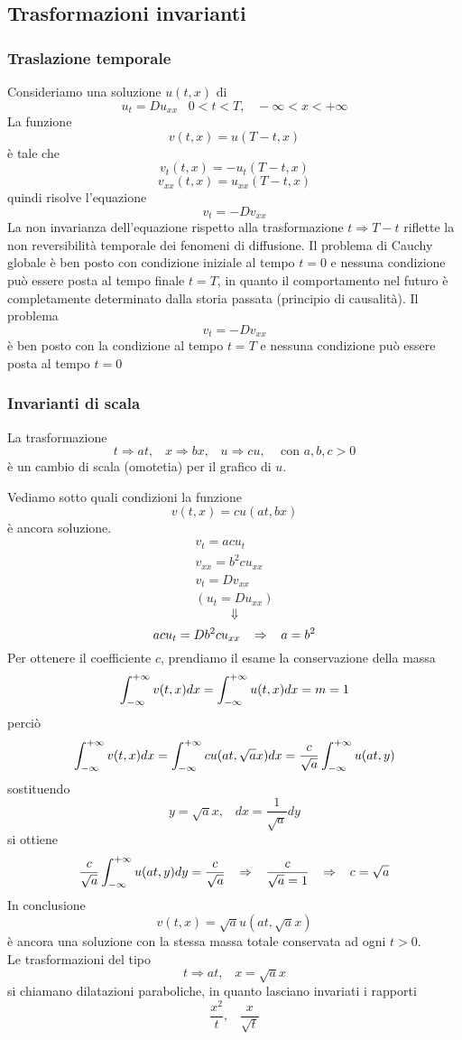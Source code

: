 \subsection{Trasformazioni invarianti}
\subsubsection{Traslazione temporale}
Consideriamo una soluzione $u(t,x)$ di
\[
	u_t= Du_{xx} \;\;\; 0< t< T, \;\;\; - \infty <x < +\infty
\]
La funzione
\[
	v(t,x)= u(T-t,x)
\]
\`e tale che
\[
	v_t(t,x)= -u_t(T-t, x)
\]
\[
	v_{xx}(t, x)= u_{xx}(T-t,x)
\]
quindi risolve l'equazione
\[
	v_t= -Dv_{xx}
\]
La non invarianza dell'equazione rispetto alla trasformazione $t \Rightarrow
T-t$
riflette la non reversibilit\`a temporale dei fenomeni di diffusione.
Il problema di Cauchy globale \`e ben posto con condizione iniziale al tempo
$t=0$ e nessuna condizione pu\`o essere posta al tempo finale $t=T$, in quanto
il comportamento nel futuro \`e completamente determinato dalla storia passata
(principio di causalit\`a).
Il problema
\[
	v_t= -Dv_{xx}
\]
\`e ben posto con la condizione al tempo $t=T$ e nessuna condizione pu\`o essere
posta al tempo $t=0$
\subsubsection{Invarianti di scala}
La trasformazione
\[
	t\Rightarrow at, \;\;\; x \Rightarrow bx, \;\;\; u\Rightarrow cu,
	\;\;\;
	\text{ con }
	a,b,c>0
\]
\`e un cambio di scala (omotetia) per il grafico di $u$.

Vediamo sotto quali condizioni la funzione
\[
	v(t,x)= cu(at, bx)
\]
\`e ancora soluzione.
\[
	\begin{array}{l}
		v_t= acu_t \\
		v_{xx}= b^2 c u_{xx}  \\
		v_t= Dv_{xx} \\
		\left( u_t= Du_{xx} \right)
	\end{array}
\]
\[
	\Downarrow
\]
\[
	acu_t= Db^2 c u_{xx} \;\;\; \Rightarrow \;\;\; a=b^2
\]
Per ottenere il coefficiente $c$, prendiamo il esame la conservazione della
massa
\[
	\int_{- \infty}^{+ \infty} v(t,x) dx = \int_{- \infty}^{+ \infty} u(t,x) dx = m= 1
\]
perci\`o
\[
	\int_{- \infty}^{+ \infty} v(t,x) dx=
	\int_{- \infty}^{+ \infty} cu(at, \sqrt{a}x) dx= \frac{c}{\sqrt{a}}
	\int_{- \infty}^{+ \infty} u(at,y)
\]
sostituendo
\[
	y=\sqrt{a}x, \;\;\; dx= \frac{1}{\sqrt{a}}dy
\]
si ottiene
\[
	\frac{c}{\sqrt{a}}
	\int_{- \infty}^{+ \infty} u(at,y)dy= \frac{c}{\sqrt{a}}
	\;\;\; \Rightarrow \;\;\;
	\frac{c}{\sqrt{a}=1}
	\;\;\; \Rightarrow \;\;\;
	c=\sqrt{a}
\]
In conclusione
\[
	v(t,x)= \sqrt{a}u(at, \sqrt{a}x)
\]
\`e ancora una soluzione con la stessa massa totale conservata ad ogni $t>0$.\\
Le trasformazioni del tipo
\[
	t\Rightarrow at, \;\;\; x=\sqrt{a} x
\]
si chiamano dilatazioni paraboliche, in quanto lasciano invariati i rapporti
\[
	\frac{x^2}{t}, \;\;\; \frac{x}{\sqrt{t}}
\]
